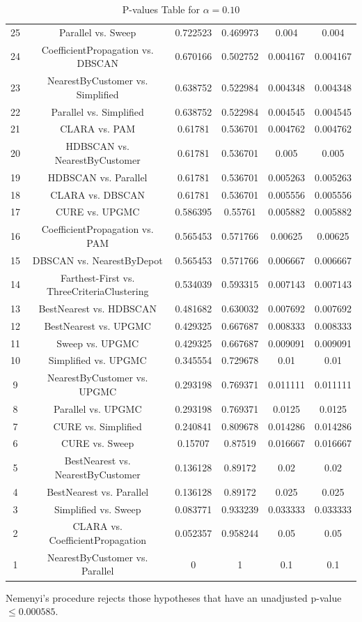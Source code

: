 \documentclass[a4paper,10pt]{article}
\begin{document}
\begin{landscape}
\begin{table}[!htp]
\begin{tabular}{cccccc}
25&Parallel vs. Sweep&0.722523&0.469973&0.004&0.004\\
24&CoefficientPropagation vs. DBSCAN&0.670166&0.502752&0.004167&0.004167\\
23&NearestByCustomer vs. Simplified&0.638752&0.522984&0.004348&0.004348\\
22&Parallel vs. Simplified&0.638752&0.522984&0.004545&0.004545\\
21&CLARA vs. PAM&0.61781&0.536701&0.004762&0.004762\\
20&HDBSCAN vs. NearestByCustomer&0.61781&0.536701&0.005&0.005\\
19&HDBSCAN vs. Parallel&0.61781&0.536701&0.005263&0.005263\\
18&CLARA vs. DBSCAN&0.61781&0.536701&0.005556&0.005556\\
17&CURE vs. UPGMC&0.586395&0.55761&0.005882&0.005882\\
16&CoefficientPropagation vs. PAM&0.565453&0.571766&0.00625&0.00625\\
15&DBSCAN vs. NearestByDepot&0.565453&0.571766&0.006667&0.006667\\
14&Farthest-First vs. ThreeCriteriaClustering&0.534039&0.593315&0.007143&0.007143\\
13&BestNearest vs. HDBSCAN&0.481682&0.630032&0.007692&0.007692\\
12&BestNearest vs. UPGMC&0.429325&0.667687&0.008333&0.008333\\
11&Sweep vs. UPGMC&0.429325&0.667687&0.009091&0.009091\\
10&Simplified vs. UPGMC&0.345554&0.729678&0.01&0.01\\
9&NearestByCustomer vs. UPGMC&0.293198&0.769371&0.011111&0.011111\\
8&Parallel vs. UPGMC&0.293198&0.769371&0.0125&0.0125\\
7&CURE vs. Simplified&0.240841&0.809678&0.014286&0.014286\\
6&CURE vs. Sweep&0.15707&0.87519&0.016667&0.016667\\
5&BestNearest vs. NearestByCustomer&0.136128&0.89172&0.02&0.02\\
4&BestNearest vs. Parallel&0.136128&0.89172&0.025&0.025\\
3&Simplified vs. Sweep&0.083771&0.933239&0.033333&0.033333\\
2&CLARA vs. CoefficientPropagation&0.052357&0.958244&0.05&0.05\\
1&NearestByCustomer vs. Parallel&0&1&0.1&0.1\\
\hline
\end{tabular}
\caption{P-values Table for $\alpha=0.10$}
\end{table}Nemenyi's procedure rejects those hypotheses that have an unadjusted p-value $\le0.000585$.


\end{landscape}
\end{document}
